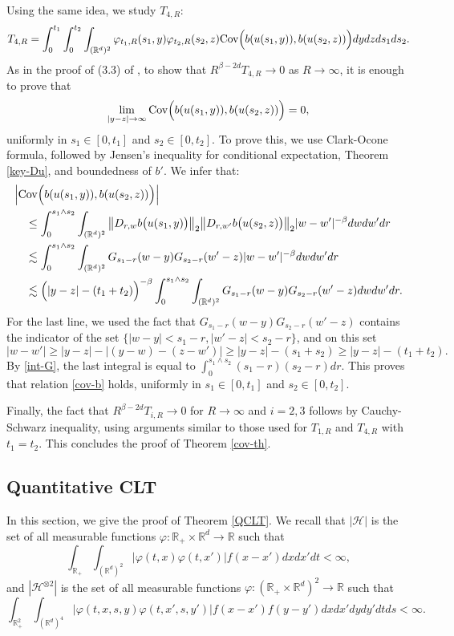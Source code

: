 \documentclass[12pt]{article}
\def\cH{\mathcal{H}}
\def\bR{\mathbb{R}}
\newcommand{\les}{\lesssim}
\begin{document}
Using the same idea, we study $T_{4,R}$:
\[
T_{4,R}= \int_0^{t_1} \int_0^{t_2} \int_{(\bR^d)^2} \varphi_{t_1,R}(s_1,y) \varphi_{t_2,R} (s_2,z) {\rm Cov}\Big(b(u(s_1,y)), b(u(s_2,z))\Big) dydz ds_1 ds_2.
\]
As in the proof of (3.3) of \cite{BNZ}, to show that $R^{\beta-2d}T_{4,R}\to 0$ as $R \to \infty$, it is enough to prove that
\begin{equation}
\label{cov-b}
\lim_{|y-z|\to \infty}{\rm Cov}\Big(b(u(s_1,y)), b(u(s_2,z))\Big) = 0,
\end{equation}
uniformly in $s_1\in [0,t_1]$ and $s_2 \in [0,t_2]$. 
To prove this, we use Clark-Ocone formula, followed by Jensen's inequality for conditional expectation, Theorem \ref{key-Du}, and boundedness of $b'$. We infer that:
\begin{align*}
& \Big|{\rm Cov}\Big(b(u(s_1,y)), b(u(s_2,z))\Big)\Big| \\
& \quad\leq \int_{0}^{s_1 \wedge s_2} \int_{(\bR^d)^2} 
\big\|D_{r,w} b\big(u(s_1,y)\big)\big\|_2 \big\|D_{r,w'} b\big(u(s_2,z)\big)\big\|_2 |w-w'|^{-\beta}dw dw' dr\\
& \quad \les \int_{0}^{s_1 \wedge s_2} \int_{(\bR^d)^2} G_{s_1-r}(w-y) G_{s_2-r}(w'-z)|w-w'|^{-\beta} dw dw' dr \\
& \quad \les \Big(|y-z|-(t_1+t_2)\Big)^{-\beta} \int_{0}^{s_1 \wedge s_2} \int_{(\bR^d)^2} G_{s_1-r}(w-y) G_{s_2-r}(w'-z)dw dw' dr .
\end{align*}
For the last line, we used the fact that $G_{s_1-r}(w-y) G_{s_2-r}(w'-z)$ contains the indicator of the set $\{|w-y|<s_1-r,|w'-z|<s_2-r\}$, and on this set
\[
|w-w'|\geq |y-z|-|(y-w)-(z-w')| \geq |y-z|-(s_1+s_2)\geq |y-z|-(t_1+t_2).
\]
By \eqref{int-G}, the last integral is equal to
$\int_0^{s_1 \wedge s_2} (s_1-r)(s_2-r)dr$. This proves that relation \eqref{cov-b} holds, uniformly in $s_1 \in [0,t_1]$ and $s_2 \in [0,t_2]$.

Finally, the fact that $R^{\beta-2d}T_{i,R}\to 0$ for $R \to \infty$ and $i=2,3$ follows by Cauchy-Schwarz inequality, using arguments similar to those used for $T_{1,R}$ and $T_{4,R}$ with $t_1=t_2$.
This concludes the proof of Theorem \ref{cov-th}.

\subsection{Quantitative CLT}

In this section, we give the proof of Theorem \ref{QCLT}. We recall that $|\cH|$ is the set of all measurable functions $\varphi: \bR_{+}\times \bR^d \to \bR$ such that
\[
\int_{\bR_{+}} \int_{(\bR^d)^2}|\varphi(t,x) \varphi(t,x')| f(x-x') dxdx'dt<\infty,
\]
and $|\cH^{\otimes 2}|$ is the set of all measurable functions $\varphi: (\bR_{+}\times \bR^d)^2 \to \bR$ such that
\[
\int_{\bR_{+}^2} \int_{(\bR^d)^4}|\varphi(t,x,s,y) \varphi(t,x',s,y')| f(x-x') f(y-y')dxdx'dydy'dt ds<\infty.
\]
\end{document}
